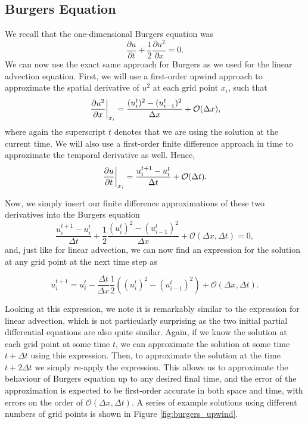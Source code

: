 \subsection{Burgers Equation}
We recall that the one-dimensional Burgers equation was
\begin{equation}
	\frac{\partial u}{\partial t} +  \frac{1}{2} \frac{\partial u^2}{\partial x} = 0.
\end{equation}
We can now use the exact same approach for Burgers as we used for the linear advection equation. First, we will use a first-order upwind approach to approximate the spatial derivative of $u^2$ at each grid point $x_i$, such that
\begin{equation}
	\left.\frac{\partial u^2}{\partial x}\right\rvert_{x_i}^{} = \frac{(u_i^t)^2 - (u_{i-1}^t)^2}{\Delta x} + \mathcal{O}(\Delta x),
\end{equation}
where again the superscript $t$ denotes that we are using the solution at the current time. We will also use a first-order finite difference approach in time to approximate the temporal derivative as well. Hence,
\begin{equation}
	\left.\frac{\partial u}{\partial t}\right\rvert_{x_i}^{} = \frac{u_i^{t+1} - u_{i}^t}{\Delta t} + \mathcal{O}(\Delta t).
\end{equation}

Now, we simply insert our finite difference approximations of these two derivatives into the Burgers equation
\begin{equation}
	\frac{u_i^{t+1} - u_{i}^t}{\Delta t} +  \frac{1}{2}\frac{(u_i^t)^2 - (u_{i-1}^t)^2}{\Delta x} + \mathcal{O}(\Delta x, \Delta t) = 0,
\end{equation}
and, just like for linear advection, we can now find an expression for the solution at any grid point at the next time step as
\begin{eqBox}
\begin{equation}
	u_i^{t+1} = u_{i}^t - \frac{\Delta t}{\Delta x} \frac{1}{2}\left( \left(u_i^t \right)^2 - \left( u_{i-1}^t \right)^2 \right) + \mathcal{O}(\Delta x, \Delta t).
	\label{eq:fd_burgers}
\end{equation}
\end{eqBox}
Looking at this expression, we note it is remarkably similar to the expression for linear advection, which is not particularly surprising as the two initial partial differential equations are also quite similar. Again, if we know the solution at each grid point at some time $t$, we can approximate the solution at some time $t+\Delta t$ using this expression. Then, to approximate the solution at the time $t+2\Delta t$ we simply re-apply the expression. This allows us to approximate the behaviour of Burgers equation up to any desired final time, and the error of the approximation is expected to be first-order accurate in both space and time, with errors on the order of $\mathcal{O}(\Delta x, \Delta t)$. A series of example solutions using different numbers of grid points is shown in Figure \ref{fig:burgers_upwind}.

